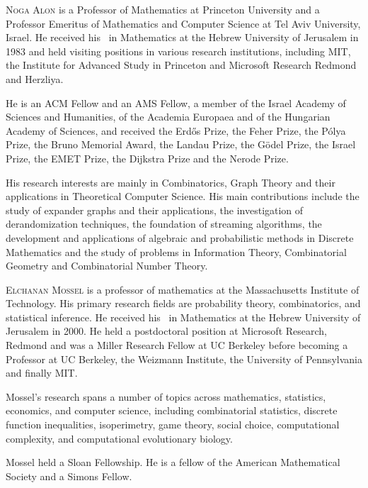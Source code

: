 \documentclass{toc}
\begin{document}
\begin{tocaboutauthors}
\begin{tocabout}[alon]  
  \textsc{Noga Alon} is a Professor of Mathematics at Princeton
  University and a Professor Emeritus of Mathematics and Computer
  Science at Tel Aviv University, Israel. He received his \phd\ in
  Mathematics at the Hebrew University of Jerusalem in 1983 and
%
held   %
visiting positions in various research
%
institutions,  %
including MIT, the
Institute for Advanced Study in Princeton and 
Microsoft Research Redmond and Herzliya.  
%

\noindent
He is an ACM Fellow and an AMS Fellow, a member of the Israel Academy of 
Sciences and Humanities, of the Academia Europaea and of the 
Hungarian Academy of Sciences, and received the
%
Erd\H{o}s Prize, 
the Feher Prize, 
%
the P\'olya Prize, %
the Bruno Memorial Award, 
the Landau Prize, the 
%
G\"odel Prize,  %
the Israel Prize, the EMET Prize, 
the Dijkstra Prize
and the Nerode Prize.

\noindent
His research interests are mainly in Combinatorics, Graph Theory
and their applications in Theoretical Computer Science. His main
contributions include the study of expander graphs and their applications,
the investigation of derandomization techniques, the foundation of
streaming algorithms, the development and applications of algebraic and
probabilistic methods in Discrete Mathematics and the study of problems
in Information Theory, Combinatorial Geometry and Combinatorial Number
Theory.  
\end{tocabout}
%
\begin{tocabout}[mossel]
  \textsc{Elchanan Mossel} is a professor of mathematics at the
  Massachusetts Institute of Technology. His primary research fields
  are probability theory, combinatorics, and statistical inference. He
  received his \phd\ in Mathematics at the Hebrew University of
  Jerusalem in 2000.  He held a postdoctoral position at
  Microsoft Research, Redmond 
%
  and was a Miller Research Fellow at UC Berkeley before
  becoming a Professor at UC Berkeley, the Weizmann Institute, the
  University of Pennsylvania and finally MIT.

\noindent
Mossel's research spans a number of topics across mathematics, statistics, economics, and computer science, including combinatorial statistics, discrete function inequalities, isoperimetry, game theory, social choice, computational complexity, and computational evolutionary biology.

\noindent
Mossel held a Sloan Fellowship. He is a fellow of the 
American Mathematical Society and a Simons Fellow. 


\end{tocabout}
\end{tocaboutauthors}
\end{document}
